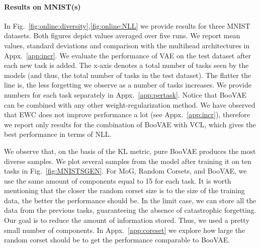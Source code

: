 \paragraph{Results on MNIST(s)}
In Fig.~\ref{fig:online:diversity},\ref{fig:online:NLL} we provide results for three MNIST datasets. 
Both figures depict values averaged over five runs. We report mean values, standard deviations and comparison with the multihead architectures in Appx.~\ref{app:incr}. We evaluate the performance of VAE on the test dataset after each new task is added. The x-axis denotes a total number of tasks seen by the models (and thus, the total number of tasks in the test dataset). The flatter the line is, the less forgetting we observe as a number of tasks increases.  We provide numbers for each task separately in Appx.~\ref{app:pertask}. Notice that BooVAE can be combined with any other weight-regularization method. We have observed that EWC does not improve performance a lot (see Appx.~\ref{app:incr}), therefore we report only results for the combination of BooVAE with VCL, which gives the best performance in terms of NLL.

We observe that, on the basis of the KL metric, pure BooVAE produces the most diverse samples. We plot several samples from the model after training it on ten tasks in Fig.~\ref{fig:MNISTSGEN}. For MoG, Random Corsets, and BooVAE, we use the same amount of components equal to 15 for each task. It is worth mentioning that the closer the random corset size is to the size of the training data, the better the performance should be. In the limit case, we can store all the data from the previous tasks, guaranteeing the absence of catastrophic forgetting. Our goal is to reduce the amount of information stored. Thus, we used a pretty small number of components. In Appx.~\ref{app:coreset} we explore how large the random corset should be to get the performance comparable to BooVAE. 


